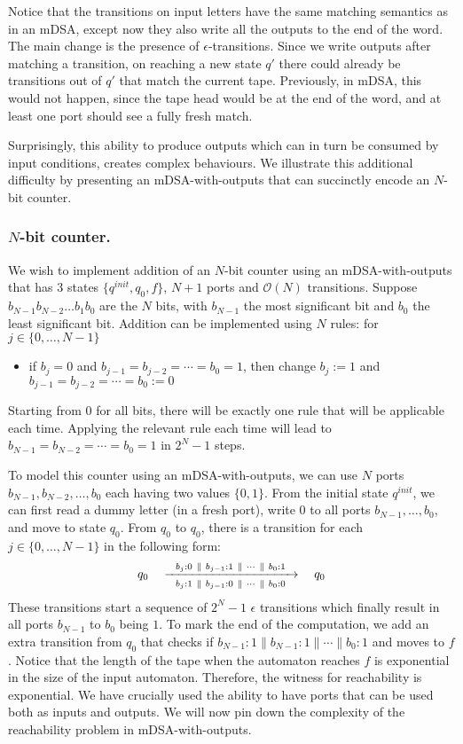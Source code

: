Notice that the transitions on input letters have the same matching semantics as in an mDSA, except now they also write all the outputs to the end of the word. The main change is the presence of $\epsilon$-transitions. Since we write outputs after matching a transition, on reaching a new state $q'$ there could already be transitions out of $q'$ that match the current tape. Previously, in mDSA, this would not happen, since the tape head would be at the end of the word, and at least one port should see a fully fresh match. 

Surprisingly, this ability to produce outputs which can in turn be consumed by input conditions, creates complex behaviours.  We illustrate this additional difficulty by presenting an mDSA-with-outputs that can succinctly encode an $N$-bit counter.

\subsubsection*{$N$-bit counter.} We wish to implement addition of an $N$-bit counter using an mDSA-with-outputs that has $3$ states $\{q^{init}, q_0, f\}$, $N+1$ ports and $\mathcal{O}(N)$ transitions. Suppose $b_{N-1} b_{N-2} \dots b_1 b_0$ are the $N$ bits, with $b_{N-1}$ the most significant bit and $b_0$ the least significant bit. Addition can be implemented using $N$ rules: for $j \in \{0, \dots, N-1\}$
\begin{itemize}
\item if $b_j = 0$ and $b_{j-1} = b_{j-2} = \cdots = b_0 = 1$, then change $b_j:= 1$ and $b_{j-1} = b_{j-2} = \cdots = b_0 := 0$
\end{itemize}
Starting from $0$ for all bits, there will be exactly one rule that will be applicable each time. Applying the relevant rule each time will lead to $b_{N-1} = b_{N-2} = \cdots = b_0 = 1$ in $2^N - 1$ steps.

To model this counter using an mDSA-with-outputs, we can use $N$ ports $b_{N-1}, b_{N-2}, \dots, b_0$ each having two values $\{0, 1\}$. From the initial state $q^{init}$, we can first read a dummy letter (in a fresh port), write $0$ to all ports $b_{N-1}, \dots, b_0$, and move to state $q_0$. From $q_{0}$ to $q_{0}$, there is a transition for each $j \in \{0, \dots, N-1\}$ in the following form: 
\begin{align*}
q_0 \quad \xrightarrow[~~b_j:1 ~\parallel~ b_{j-1}:0 ~\parallel~ \cdots ~\parallel~ b_0: 0~~]{ b_j:0 ~\parallel~ b_{j-1}:1 ~\parallel~ \cdots ~\parallel~ b_0: 1} \quad q_0
\end{align*}
These transitions start a sequence of $2^N -1$ $\epsilon$ transitions which finally result in all ports $b_{N-1}$ to $b_0$ being $1$. To mark the end of the computation, we add an extra transition from $q_0$ that checks if $b_{N-1}:1 \parallel b_{N-1}:1 \parallel \cdots \parallel b_0:1$ and moves to $f$. Notice that the length of the tape when the automaton reaches $f$ is exponential in the size of the input automaton. Therefore, the witness for reachability is exponential. We have crucially used the ability to have ports that can be used both as inputs and outputs. We will now pin down the complexity of the reachability problem in mDSA-with-outputs. 

